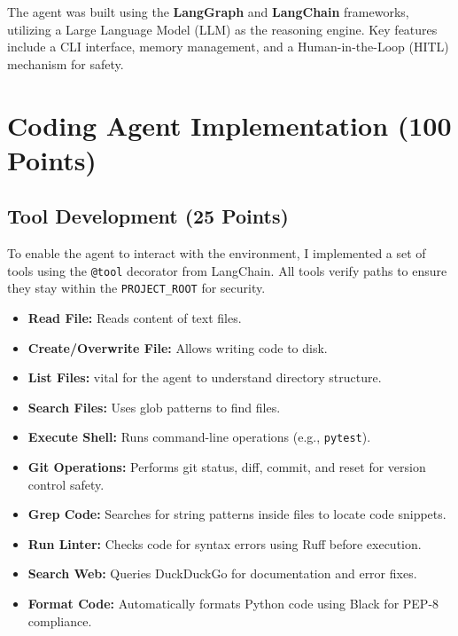 \documentclass[12pt, a4paper]{article}
\begin{document}
The agent was built using the \textbf{LangGraph} and \textbf{LangChain} frameworks, utilizing a Large Language Model (LLM) as the reasoning engine. Key features include a CLI interface, memory management, and a Human-in-the-Loop (HITL) mechanism for safety.

\section{Coding Agent Implementation (100 Points)}

\subsection{Tool Development (25 Points)}
To enable the agent to interact with the environment, I implemented a set of tools using the \texttt{@tool} decorator from LangChain. All tools verify paths to ensure they stay within the \texttt{PROJECT\_ROOT} for security.

\begin{itemize}
    \item \textbf{Read File:} Reads content of text files.
    \item \textbf{Create/Overwrite File:} Allows writing code to disk.
    \item \textbf{List Files:} vital for the agent to understand directory structure.
    \item \textbf{Search Files:} Uses glob patterns to find files.
    \item \textbf{Execute Shell:} Runs command-line operations (e.g., \texttt{pytest}).
    \item \textbf{Git Operations:} Performs git status, diff, commit, and reset for version control safety.
    \item \textbf{Grep Code:} Searches for string patterns inside files to locate code snippets.
    \item \textbf{Run Linter:} Checks code for syntax errors using Ruff before execution.
    \item \textbf{Search Web:} Queries DuckDuckGo for documentation and error fixes.
    \item \textbf{Format Code:} Automatically formats Python code using Black for PEP-8 compliance.
\end{itemize}
\end{document}
